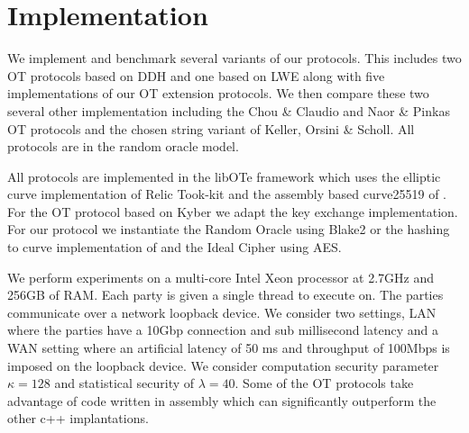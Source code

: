\section{Implementation}\label{sec:impl}

We implement and benchmark several variants of our protocols. This includes two OT protocols based on DDH and one based on LWE along with five implementations of our OT extension protocols. We then compare these two several other implementation including the Chou \& Claudio \cite{LC:ChoOrl15} and Naor \& Pinkas \cite{SODA:NaoPin01} OT protocols and the chosen string variant of Keller, Orsini \& Scholl\cite{C:KelOrsSch15}.  All protocols are in the random oracle model.

All protocols are implemented in the libOTe framework\cite{libOTe} which uses the elliptic curve implementation of Relic Took-kit\cite{relic} and the assembly based curve25519 of \cite{LC:ChoOrl15,simplest}. For the OT protocol based on Kyber we adapt the \cite{kyber} key exchange implementation. For our protocol we instantiate the Random Oracle using Blake2 or the hashing to curve implementation of \cite{relic} and the Ideal Cipher using AES.

We perform experiments on a multi-core Intel Xeon processor at 2.7GHz and 256GB of RAM. Each party is given a single thread to execute on. The parties communicate over a network loopback device. We consider two settings, LAN where the parties have a 10Gbp connection and sub millisecond latency and a WAN setting where an artificial latency of 50 ms and throughput of 100Mbps is imposed on the loopback device. We consider computation security parameter $\kappa=128$ and statistical security of $\lambda=40$.  Some of the OT protocols take advantage of code written in assembly which can significantly outperform the other c++ implantations.


